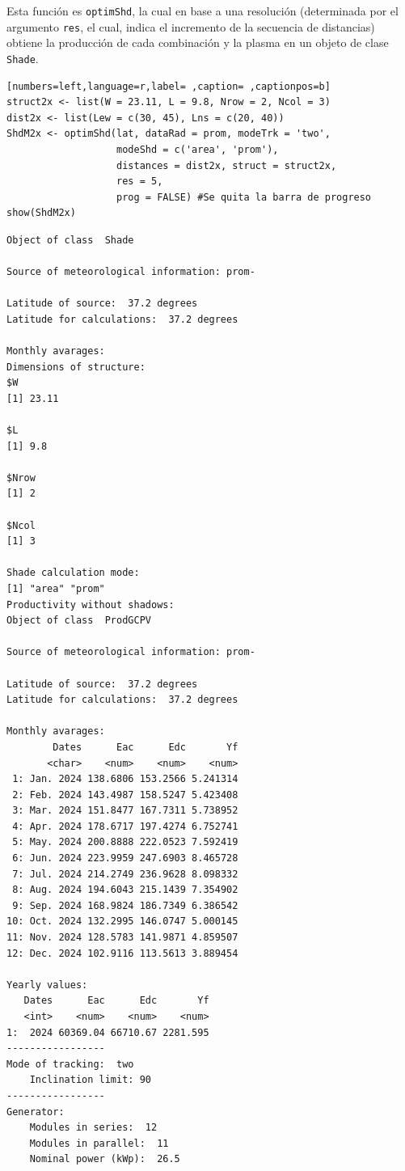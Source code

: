 Esta función es \texttt{optimShd}, la cual en base a una resolución (determinada por el argumento \texttt{res}, el cual, indica el incremento de la secuencia de distancias) obtiene la producción de cada combinación y la plasma en un objeto de clase \texttt{Shade}.
\begin{lstlisting}[numbers=left,language=r,label= ,caption= ,captionpos=b]
struct2x <- list(W = 23.11, L = 9.8, Nrow = 2, Ncol = 3)
dist2x <- list(Lew = c(30, 45), Lns = c(20, 40))
ShdM2x <- optimShd(lat, dataRad = prom, modeTrk = 'two',
                   modeShd = c('area', 'prom'),
                   distances = dist2x, struct = struct2x,
                   res = 5,
                   prog = FALSE) #Se quita la barra de progreso
show(ShdM2x)
\end{lstlisting}

\begin{verbatim}
Object of class  Shade 

Source of meteorological information: prom- 

Latitude of source:  37.2 degrees
Latitude for calculations:  37.2 degrees

Monthly avarages:
Dimensions of structure:
$W
[1] 23.11

$L
[1] 9.8

$Nrow
[1] 2

$Ncol
[1] 3

Shade calculation mode:
[1] "area" "prom"
Productivity without shadows:
Object of class  ProdGCPV 

Source of meteorological information: prom- 

Latitude of source:  37.2 degrees
Latitude for calculations:  37.2 degrees

Monthly avarages:
        Dates      Eac      Edc       Yf
       <char>    <num>    <num>    <num>
 1: Jan. 2024 138.6806 153.2566 5.241314
 2: Feb. 2024 143.4987 158.5247 5.423408
 3: Mar. 2024 151.8477 167.7311 5.738952
 4: Apr. 2024 178.6717 197.4274 6.752741
 5: May. 2024 200.8888 222.0523 7.592419
 6: Jun. 2024 223.9959 247.6903 8.465728
 7: Jul. 2024 214.2749 236.9628 8.098332
 8: Aug. 2024 194.6043 215.1439 7.354902
 9: Sep. 2024 168.9824 186.7349 6.386542
10: Oct. 2024 132.2995 146.0747 5.000145
11: Nov. 2024 128.5783 141.9871 4.859507
12: Dec. 2024 102.9116 113.5613 3.889454

Yearly values:
   Dates      Eac      Edc       Yf
   <int>    <num>    <num>    <num>
1:  2024 60369.04 66710.67 2281.595
-----------------
Mode of tracking:  two 
    Inclination limit: 90 
-----------------
Generator:
    Modules in series:  12 
    Modules in parallel:  11 
    Nominal power (kWp):  26.5 


\end{verbatim}
